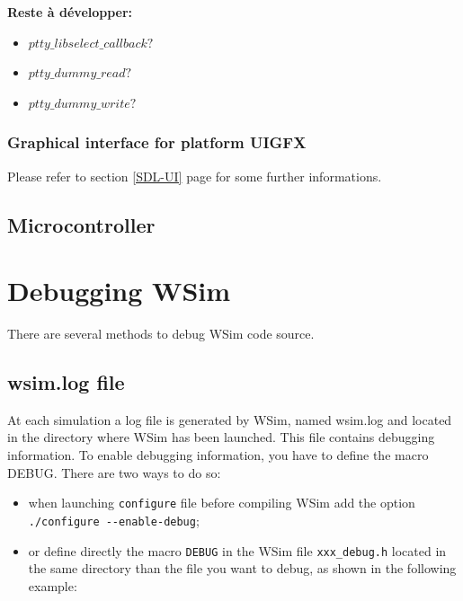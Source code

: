 \documentclass[a4paper,10pt]{report}
\begin{document}
\textbf{Reste à développer:}
\begin{itemize}
  \item $ptty\_libselect\_callback?$
  \item $ptty\_dummy\_read?$
  \item $ptty\_dummy\_write?$
\end{itemize}

\subsection{Graphical interface for platform UIGFX}
Please refer to section \ref{SDL-UI} page \pageref{SDL-UI} for some further informations.


\section{Microcontroller}


\chapter{Debugging WSim}

There are several methods to debug WSim code source.

\section{wsim.log file}

At each simulation a log file is generated by WSim, named wsim.log and located in the directory where WSim has been launched. This file contains debugging information.
To enable debugging information, you have to define the macro DEBUG. There are two ways to do so:

\begin{itemize}
  \item when launching \verb$configure$ file before compiling WSim add the option \verb$./configure --enable-debug$;
  \item or define directly the macro \verb$DEBUG$ in the WSim file \verb$xxx_debug.h$ located in the same directory than the file you want to debug, as shown in the following example:
\end{itemize}
\end{document}
